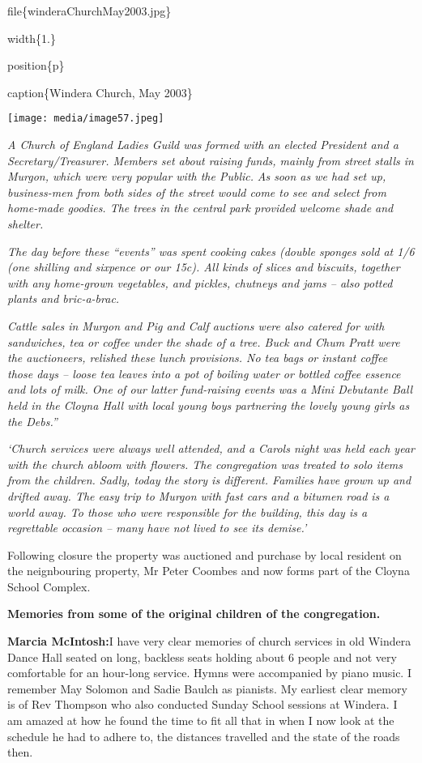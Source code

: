 file\{winderaChurchMay2003.jpg\}

width\{1.\}

position\{p\}

caption\{Windera Church, May 2003\}

\texttt{[image: media/image57.jpeg]}

\emph{A Church of England Ladies Guild was formed with an elected President and a Secretary/Treasurer. Members set about raising funds, mainly from street stalls in Murgon, which were very popular with the Public.} \emph{As soon as we had set up, business-men from both sides of the street would come to see and select from home-made goodies. The trees in the central park provided welcome shade and shelter.}

\emph{The day before these ``events'' was spent cooking cakes (double sponges sold at 1/6 (one shilling and sixpence or our 15c). All kinds of slices and biscuits, together with any home-grown vegetables, and pickles, chutneys and jams -- also potted plants and bric-a-brac.}

\emph{Cattle sales in Murgon and Pig and Calf auctions were also catered for with sandwiches, tea or coffee under the shade of a tree. Buck and Chum Pratt were the auctioneers, relished these lunch provisions. No tea bags or instant coffee those days -- loose tea leaves into a pot of boiling water or bottled coffee essence and lots of milk. One of our latter fund-raising events was a Mini Debutante Ball held in the Cloyna Hall with local young boys partnering the lovely young girls as the Debs.''}

\emph{`Church services were always well attended, and a Carols night was held each year with the church abloom with flowers. The congregation was treated to solo items from the children. Sadly, today the story is different. Families have grown up and drifted away. The easy trip to Murgon with fast cars and a bitumen road is a world away. To those who were responsible for the building, this day is a regrettable occasion -- many have not lived to see its demise.'}

Following closure the property was auctioned and purchase by local resident on the neignbouring property, Mr Peter Coombes and now forms part of the Cloyna School Complex.

\textbf{Memories from some of the original children of the congregation.}

\textbf{Marcia McIntosh:}I have very clear memories of church services in old Windera Dance Hall seated on long, backless seats holding about 6 people and not very comfortable for an hour-long service. Hymns were accompanied by piano music. I remember May Solomon and Sadie Baulch as pianists. My earliest clear memory is of Rev Thompson who also conducted Sunday School sessions at Windera. I am amazed at how he found the time to fit all that in when I now look at the schedule he had to adhere to, the distances travelled and the state of the roads then.

